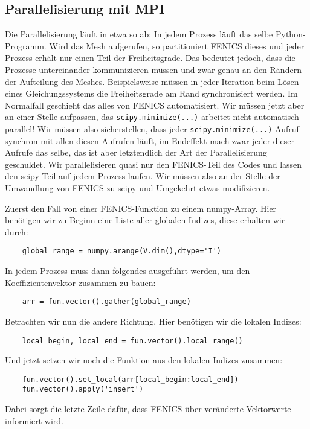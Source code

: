 \documentclass[a4paper, 12pt]{scrartcl}
\begin{document}
\subsection{Parallelisierung mit MPI}
Die Parallelisierung läuft in etwa so ab: In jedem Prozess läuft das selbe Python-Programm. Wird das Mesh aufgerufen, so partitioniert FENICS dieses und jeder Prozess erhält nur einen Teil der Freiheitsgrade. Das bedeutet jedoch, dass die Prozesse untereinander kommunizieren müssen und zwar genau an den Rändern der Aufteilung des Meshes. Beispielsweise müssen in jeder Iteration beim Lösen eines Gleichungssystems die Freiheitsgrade am Rand synchronisiert werden. Im Normalfall geschieht das alles von FENICS automatisiert. Wir müssen jetzt aber an einer Stelle aufpassen, das \verb|scipy.minimize(...)| arbeitet nicht automatisch parallel! Wir müssen also sicherstellen, dass jeder \verb|scipy.minimize(...)| Aufruf synchron mit allen diesen Aufrufen läuft, im Endeffekt mach zwar jeder dieser Aufrufe das selbe, das ist aber letztendlich der Art der Parallelisierung geschuldet. Wir parallelisieren quasi nur den FENICS-Teil des Codes und lassen den scipy-Teil auf jedem Prozess laufen. Wir müssen also an der Stelle der Umwandlung von FENICS zu scipy und Umgekehrt etwas modifizieren.

Zuerst den Fall von einer FENICS-Funktion zu einem numpy-Array. Hier benötigen wir zu Beginn eine Liste aller globalen Indizes, diese erhalten wir durch:
\begin{verbatim}
	global_range = numpy.arange(V.dim(),dtype='I')
\end{verbatim}
In jedem Prozess muss dann folgendes ausgeführt werden, um den Koeffizientenvektor zusammen zu bauen:
\begin{verbatim}
	arr = fun.vector().gather(global_range)
\end{verbatim}
Betrachten wir nun die andere Richtung. Hier benötigen wir die lokalen Indizes:
\begin{verbatim}
	local_begin, local_end = fun.vector().local_range()
\end{verbatim}
Und jetzt setzen wir noch die Funktion aus den lokalen Indizes zusammen:
\begin{verbatim}
	fun.vector().set_local(arr[local_begin:local_end])
	fun.vector().apply('insert')
\end{verbatim}
Dabei sorgt die letzte Zeile dafür, dass FENICS über veränderte Vektorwerte informiert wird.
\end{document}
